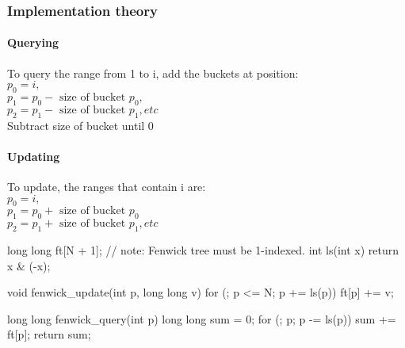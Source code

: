 \documentclass{article}
\begin{document}
\subsubsection{Implementation theory}
\paragraph{Querying}
To query the range from 1 to i, add the buckets at position:\\
\(p_0 = i,\)\\
\(p_1 = p_0 - \text{ size of bucket } p_0,\)\\
\(p_2 = p_1 - \text{ size of bucket } p_1,etc\)\\
Subtract size of bucket until 0
\paragraph{Updating}
To update, the ranges that contain i are:\\
\(p_0 = i,\)\\
\(p_1 = p_0 + \text{ size of bucket } p_0\)\\
\(p_2 = p_1 + \text{ size of bucket } p_1, etc \) \\


\begin{mylisting}{}
long long ft[N + 1]; // note: Fenwick tree must be 1-indexed.
int ls(int x) { return x & (-x); }

void fenwick_update(int p, long long v){
	for (; p <= N; p += ls(p)) ft[p] += v;
}

long long fenwick_query(int p){
	long long sum = 0;
	for (; p; p -= ls(p)) sum += ft[p];
	return sum;
}
\end{mylisting}
\end{document}
